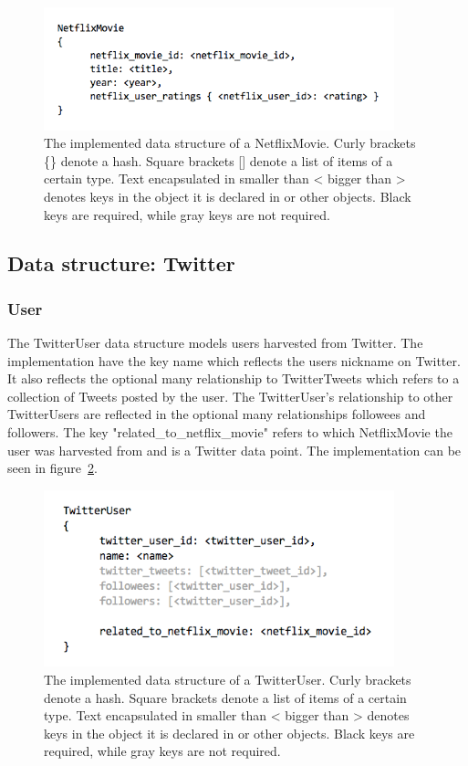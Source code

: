 	\begin{figure}[H]
	\includegraphics[width=4in]{image/datastructure-netflix-movie.png}
	\centering
	\caption[NetflixMovie data structure]{The implemented data structure of a NetflixMovie. Curly brackets \{\} denote a hash. Square brackets [] denote a list of items of a certain type. Text encapsulated in smaller than < bigger than > denotes keys in the object it is declared in or other objects. Black keys are required, while gray keys are not required.}
	\label{figure:datastructure-netflix-movie}
	\end{figure}

\subsection{Data structure: Twitter}

\subsubsection{User}
The TwitterUser data structure models users harvested from Twitter. The implementation have the key name which reflects the users nickname on Twitter. It also reflects the optional many relationship to TwitterTweets which refers to a collection of Tweets posted by the user. The TwitterUser's relationship to other TwitterUsers are reflected in the optional many relationships followees and followers. The key "related\_to\_netflix\_movie" refers to which NetflixMovie the user was harvested from and is a Twitter data point. The implementation can be seen in figure~\ref{figure:datastructure-twitter-user}.

	\begin{figure}[H]
	\includegraphics[width=4in]{image/datastructure-twitter-user.png}
	\centering
	\caption[TwitterUser data structure]{The implemented data structure of a TwitterUser. Curly brackets denote a hash. Square brackets {} denote a list of items of a certain type. Text encapsulated in smaller than < bigger than > denotes keys in the object it is declared in or other objects. Black keys are required, while gray keys are not required.}
	\label{figure:datastructure-twitter-user}
	\end{figure}

